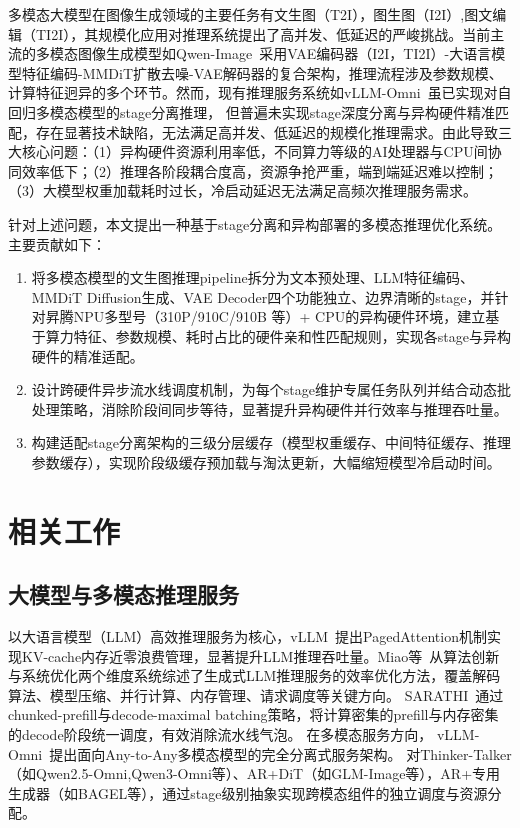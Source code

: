\documentclass{ctexart}
\begin{document}
多模态大模型在图像生成领域的主要任务有文生图（T2I），图生图（I2I）,图文编辑（TI2I），其规模化应用对推理系统提出了高并发、低延迟的严峻挑战。当前主流的多模态图像生成模型如Qwen-Image~\cite{QwenImageTechnicalReportWu2025}采用VAE编码器（I2I，TI2I）-大语言模型特征编码-MMDiT扩散去噪-VAE解码器的复合架构，推理流程涉及参数规模、计算特征迥异的多个环节。然而，现有推理服务系统如vLLM-Omni~\cite{VLLMOmniFullyDisaggregatedYin2026}虽已实现对自回归多模态模型的stage分离推理，
但普遍未实现stage深度分离与异构硬件精准匹配，存在显著技术缺陷，无法满足高并发、低延迟的规模化推理需求。由此导致三大核心问题：（1）异构硬件资源利用率低，不同算力等级的AI处理器与CPU间协同效率低下；（2）推理各阶段耦合度高，资源争抢严重，端到端延迟难以控制；（3）大模型权重加载耗时过长，冷启动延迟无法满足高频次推理服务需求。

针对上述问题，本文提出一种基于stage分离和异构部署的多模态推理优化系统。主要贡献如下：
\begin{enumerate}
    \item 将多模态模型的文生图推理pipeline拆分为文本预处理、LLM特征编码、MMDiT Diffusion生成、VAE Decoder四个功能独立、边界清晰的stage，并针对昇腾NPU多型号（310P/910C/910B 等）+ CPU的异构硬件环境，建立基于算力特征、参数规模、耗时占比的硬件亲和性匹配规则，实现各stage与异构硬件的精准适配。
    \item 设计跨硬件异步流水线调度机制，为每个stage维护专属任务队列并结合动态批处理策略，消除阶段间同步等待，显著提升异构硬件并行效率与推理吞吐量。
    \item 构建适配stage分离架构的三级分层缓存（模型权重缓存、中间特征缓存、推理参数缓存），实现阶段级缓存预加载与淘汰更新，大幅缩短模型冷启动时间。
\end{enumerate}

\section{相关工作}

\subsection{大模型与多模态推理服务}

以大语言模型（LLM）高效推理服务为核心，vLLM~\cite{EfficientMemoryManagementKwon2023}提出PagedAttention机制实现KV-cache内存近零浪费管理，显著提升LLM推理吞吐量。Miao等~\cite{EfficientGenerativeLargeMiao2026}从算法创新与系统优化两个维度系统综述了生成式LLM推理服务的效率优化方法，覆盖解码算法、模型压缩、并行计算、内存管理、请求调度等关键方向。
SARATHI~\cite{SARATHIEfficientLLMAgrawal2023}通过chunked-prefill与decode-maximal batching策略，将计算密集的prefill与内存密集的decode阶段统一调度，有效消除流水线气泡。
在多模态服务方向，
vLLM-Omni~\cite{VLLMOmniFullyDisaggregatedYin2026}提出面向Any-to-Any多模态模型的完全分离式服务架构。
对Thinker-Talker（如Qwen2.5-Omni,Qwen3-Omni等）、AR+DiT（如GLM-Image等），AR+专用生成器（如BAGEL等），通过stage级别抽象实现跨模态组件的独立调度与资源分配。
\end{document}

